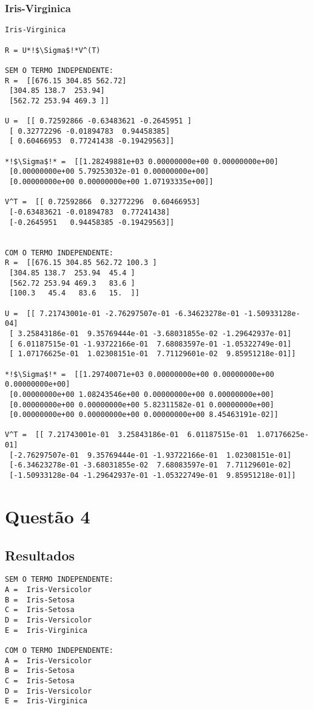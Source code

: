 \documentclass[a4paper,12pt,twoside]{article}
\begin{document}
\subsubsection{Iris-Virginica}
\begin{lstlisting}
Iris-Virginica

R = U*!$\Sigma$!*V^(T)

SEM O TERMO INDEPENDENTE: 
R =  [[676.15 304.85 562.72]
 [304.85 138.7  253.94]
 [562.72 253.94 469.3 ]]

U =  [[ 0.72592866 -0.63483621 -0.2645951 ]
 [ 0.32772296 -0.01894783  0.94458385]
 [ 0.60466953  0.77241438 -0.19429563]]

*!$\Sigma$!* =  [[1.28249881e+03 0.00000000e+00 0.00000000e+00]
 [0.00000000e+00 5.79253032e-01 0.00000000e+00]
 [0.00000000e+00 0.00000000e+00 1.07193335e+00]]

V^T =  [[ 0.72592866  0.32772296  0.60466953]
 [-0.63483621 -0.01894783  0.77241438]
 [-0.2645951   0.94458385 -0.19429563]]


COM O TERMO INDEPENDENTE: 
R =  [[676.15 304.85 562.72 100.3 ]
 [304.85 138.7  253.94  45.4 ]
 [562.72 253.94 469.3   83.6 ]
 [100.3   45.4   83.6   15.  ]]

U =  [[ 7.21743001e-01 -2.76297507e-01 -6.34623278e-01 -1.50933128e-04]
 [ 3.25843186e-01  9.35769444e-01 -3.68031855e-02 -1.29642937e-01]
 [ 6.01187515e-01 -1.93722166e-01  7.68083597e-01 -1.05322749e-01]
 [ 1.07176625e-01  1.02308151e-01  7.71129601e-02  9.85951218e-01]]

*!$\Sigma$!* =  [[1.29740071e+03 0.00000000e+00 0.00000000e+00 0.00000000e+00]
 [0.00000000e+00 1.08243546e+00 0.00000000e+00 0.00000000e+00]
 [0.00000000e+00 0.00000000e+00 5.82311582e-01 0.00000000e+00]
 [0.00000000e+00 0.00000000e+00 0.00000000e+00 8.45463191e-02]]

V^T =  [[ 7.21743001e-01  3.25843186e-01  6.01187515e-01  1.07176625e-01]
 [-2.76297507e-01  9.35769444e-01 -1.93722166e-01  1.02308151e-01]
 [-6.34623278e-01 -3.68031855e-02  7.68083597e-01  7.71129601e-02]
 [-1.50933128e-04 -1.29642937e-01 -1.05322749e-01  9.85951218e-01]]
\end{lstlisting}

\section{Questão 4}
\subsection{Resultados}
\begin{lstlisting}
SEM O TERMO INDEPENDENTE: 
A =  Iris-Versicolor
B =  Iris-Setosa
C =  Iris-Setosa
D =  Iris-Versicolor
E =  Iris-Virginica

COM O TERMO INDEPENDENTE: 
A =  Iris-Versicolor
B =  Iris-Setosa
C =  Iris-Setosa
D =  Iris-Versicolor
E =  Iris-Virginica
\end{lstlisting}
\end{document}
